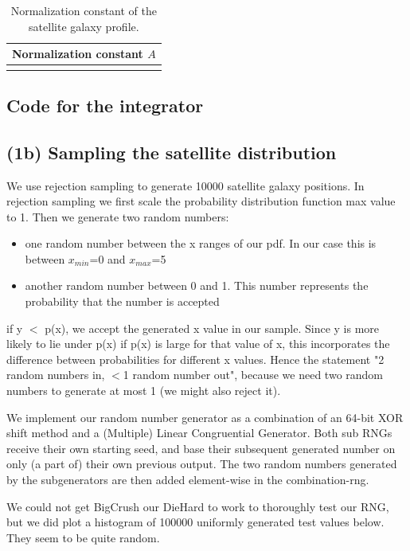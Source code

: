 \documentclass{article}
\newcommand{\CodeDir}{Code}
\newcommand{\CalcDir}{Calculations}
\begin{document}
\begin{table}[H]
  \centering
  \caption{Normalization constant of the satellite galaxy profile.}
  \label{table_A_constant}
  \begin{tabular}{|c|}
    \hline
    Normalization constant \(A\)     \\
    \hline
     \\
    \hline
  \end{tabular}
\end{table}

\subsection{Code for the integrator}



\subsection{(1b) Sampling the satellite distribution}
We use rejection sampling to generate 10000 satellite galaxy positions. In rejection sampling we first scale the probability distribution function max value to 1.
Then we generate two random numbers:
\begin{itemize}
  \item one random number between the x ranges of our pdf. In our case this is between \(x_{min}\)=0 and \(x_{max}\)=5
  \item another random number between 0 and 1. This number represents the probability that the number is accepted
\end{itemize}
if y $<$ p(x), we accept the generated x value in our sample. Since y is more likely to lie under p(x) if p(x) is large for that value of x, this incorporates the difference between probabilities for different x values.
Hence the statement "2 random numbers in, $<$1 random number out", because we need two random numbers to generate at most 1 (we might also reject it).

We implement our random number generator as a combination of an 64-bit XOR shift method and a (Multiple) Linear Congruential Generator.
Both sub RNGs receive their own starting seed, and base their subsequent generated number on only (a part of) their own previous output.
The two random numbers generated by the subgenerators are then added element-wise in the combination-rng.

We could not get BigCrush our DieHard to work to thoroughly test our RNG, but we did plot a histogram of 100000 uniformly generated test values below.
They seem to be quite random.
\end{document}
